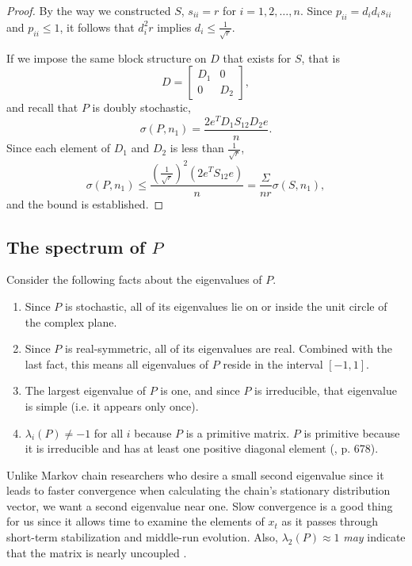\documentclass[final]{siamltex}
\begin{document}
\begin{proof}
By the way we constructed $S$, $s_{ii}=r$ for $i=1,2,\dots,n$. Since $p_{ii}=d_{i}d_{i}s_{ii}$ and $p_{ii} \le 1$, it follows that $d_{i}^{2}r$ implies  $d_{i} \le \frac{1}{\sqrt{r}}$.

If we impose the same block structure on $D$ that exists for $S$, that is
\[
D = \left[
\begin{array}{cc}
 D_{1} & 0     \\
 0 &  D_{2}          
\end{array}
\right],
\]
and recall that $P$ is doubly stochastic,
\[
\sigma(P,n_{1}) = \frac{2e^{T}D_{1}S_{12}D_{2}e}   {n}.
\]
Since each element of $D_{1}$ and $D_{2}$ is less than $\frac{1}{\sqrt{r}}$,
\[
\sigma(P,n_{1}) \le \frac{\left(\frac{1}{\sqrt{r}}\right)^{2}(2e^{T}S_{12}e)}{n} = \frac {\Sigma} {nr}  \sigma(S,n_{1}), 
\]
\noindent and the bound is established.
\end{proof}

\subsection{The spectrum of $P$} \label{sec:spec}

Consider the following facts about the eigenvalues of $P$.

\begin{enumerate}
\item Since $P$ is stochastic, all of its eigenvalues lie on or inside the unit circle of the complex plane.
\item Since $P$ is real-symmetric, all of its eigenvalues are real. Combined with the last fact, this means all eigenvalues of $P$ reside in the interval $[-1,1]$.
\item The largest eigenvalue of $P$ is one, and since $P$ is irreducible, that eigenvalue is simple (i.e. it appears only once).
\item $\lambda_{i}(P) \ne -1$ for all $i$ because $P$ is a primitive matrix. $P$ is primitive because it is irreducible and has at least one positive diagonal element (\cite{meyer2000maa}, p. 678). 
\end{enumerate} 

Unlike Markov chain researchers who desire a small second eigenvalue since it leads to faster convergence when calculating the chain's stationary distribution vector, we want a second eigenvalue near one. Slow convergence is a good thing for us since it allows time to examine the elements of $x_{t}$ as it passes through short-term stabilization and middle-run evolution. Also, $\lambda_{2}(P) \approx 1$ \emph{may} indicate that the matrix is nearly uncoupled \cite{stewart1994ins}.
\end{document}
